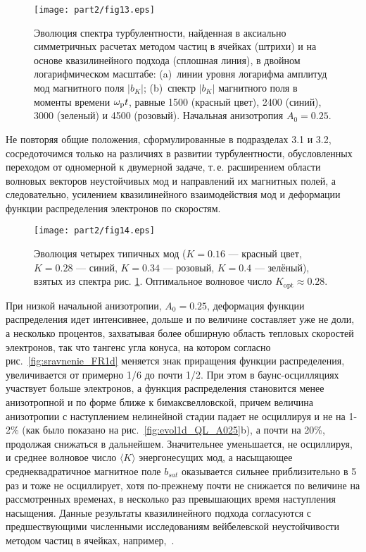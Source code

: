 \begin{figure}[t]
\centering
\texttt{[image: part2/fig13.eps]}
\caption{Эволюция спектра турбулентности, найденная в аксиально симметричных расчетах методом частиц в ячейках (штрихи) и на основе квазилинейного подхода (сплошная линия), в двойном логарифмическом масштабе: (a)~линии уровня логарифма амплитуд мод магнитного поля $|b_K|$; (b)~спектр $|b_K|$ магнитного поля в моменты времени $\omega_\mathrm{p} t$, равные 1500 (красный цвет), 2400 (синий), 3000 (зеленый) и 4500 (розовый). Начальная анизотропия $A_0=0.25$.
}
\label{fig:dinspectrA025_2d}
\end{figure}


Не повторяя общие положения, сформулированные в подразделах 3.1 и 3.2, сосредоточимся только на различиях в развитии турбулентности, обусловленных переходом от одномерной к двумерной задаче, т.\,е. расширением области волновых векторов неустойчивых мод и направлений их магнитных полей, а следовательно, усилением квазилинейного взаимодействия мод и деформации функции распределения электронов по скоростям.
\begin{figure}[t]
\centering
\texttt{[image: part2/fig14.eps]}
\caption{Эволюция четырех типичных мод ($K=0.16$ --- красный цвет, $K=0.28$ --- синий, $K=0.34$ --- розовый, $K=0.4$ --- зелёный), взятых из спектра рис. \ref{fig:dinspectrA025_2d}. Оптимальное волновое число $K_\mathrm{opt}\approx0.28$.}
\label{fig:evol_garmA025}
\end{figure}

При низкой начальной анизотропии, $A_0=0.25$, деформация функции распределения идет интенсивнее, дольше и по величине составляет уже не доли, а несколько процентов, захватывая более обширную область тепловых скоростей электронов, так что тангенс угла конуса, на котором согласно рис.~\ref{fig:sravnenie_FR1d} меняется знак приращения функции распределения, увеличивается от примерно 1/6 до почти 1/2. При этом в баунс-осцилляциях участвует больше электронов, а функция распределения становится менее анизотропной и по форме ближе к бимаксвелловской, причем величина анизотропии с наступлением нелинейной стадии падает не осциллируя и не на 1-2\% (как было показано на рис.~\ref{fig:evol1d_QL_A025}b), а почти на 20\%, продолжая снижаться в дальнейшем. Значительнее уменьшается, не осциллируя, и среднее волновое число $\langle K\rangle$ энергонесущих мод, а насыщающее среднеквадратичное магнитное поле $b_{sat}$ оказывается сильнее приблизительно в 5 раз и тоже не осциллирует, хотя по-прежнему почти не снижается по величине на рассмотренных временах, в несколько раз превышающих время наступления насыщения. Данные результаты квазилинейного подхода согласуются с предшествующими численными исследованиям вейбелевской неустойчивости методом частиц в ячейках, например,~\cite{Borodachev2010,Borodachev2016_Radiofiz}. 


